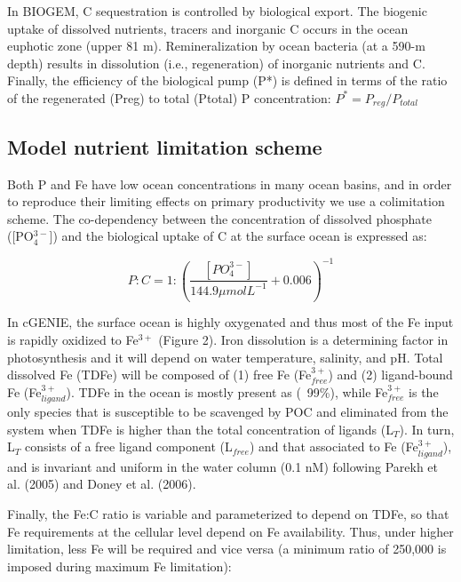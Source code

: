 In BIOGEM, C sequestration is controlled by biological export. The biogenic uptake of dissolved nutrients, tracers and inorganic C occurs in the ocean euphotic zone (upper 81 m). Remineralization by ocean bacteria (at a 590-m depth) results in dissolution (i.e., regeneration) of inorganic nutrients and C. Finally, the efficiency of the biological pump (P*) is defined in terms of the ratio of the regenerated (Preg) to total (Ptotal) P concentration: $P^{*} = P_{reg}/P_{total}$

\subsection{Model nutrient limitation scheme}

Both P and Fe have low ocean concentrations in many ocean basins, and in order to reproduce their limiting effects on primary productivity we use a colimitation scheme. The co-dependency between the concentration of dissolved phosphate ([PO$_4^{3-}$]) and the biological uptake of C at the surface ocean is expressed as:

\begin{linenomath*}
\begin{equation}
    P:C=1:\left(\frac{[PO_4^{3-}]}{144.9 \mu mol L^{-1}} + 0.006\right)^{-1}
\end{equation}
\end{linenomath*}

In cGENIE, the surface ocean is highly oxygenated and thus most of the Fe input is rapidly oxidized to Fe$^{3+}$ (Figure 2). Iron dissolution is a determining factor in photosynthesis and it will depend on water temperature, salinity, and pH. Total dissolved Fe (TDFe) will be composed of (1) free Fe (Fe$^{3+}_{free}$) and (2) ligand-bound Fe (Fe$^{3+}_{ligand}$). TDFe in the ocean is mostly present as  (~99\%), while Fe$^{3+}_{free}$ is the only species that is susceptible to be scavenged by POC and eliminated from the system when TDFe  is higher than the total concentration of ligands (L$_T$). In turn, L$_T$ consists of a free ligand component (L$_{free}$) and that associated to Fe (Fe$^{3+}_{ligand}$), and is invariant and uniform in the water column (0.1 nM) following Parekh et al. (2005) and Doney et al. (2006).

Finally, the Fe:C ratio is variable and parameterized to depend on TDFe, so that Fe requirements at the cellular level depend on Fe availability. Thus, under higher limitation, less Fe will be required and vice versa (a minimum ratio of 250,000 is imposed during maximum Fe limitation): 

